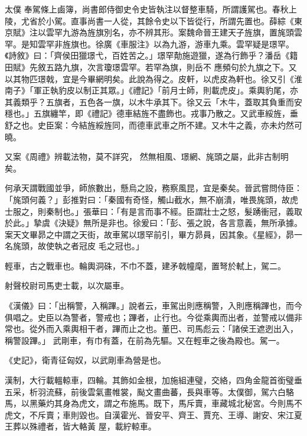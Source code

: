 \begin{pinyinscope}
 太僕
 奉駕條上鹵簿，尚書郎侍御史令史皆執注以督整車騎，所謂護駕也。春秋上陵，尤省於小駕。直事尚書一人從，其餘令史以下皆從行，所謂先置也。薛綜《東京賦》注以雲罕九游為旌旗別名，亦不辨其形。案魏命晉王建天子旌旗，置旄頭雲罕。是知雲罕非旌旗也。徐廣《車服注》以為九游，游車九乘。雲罕疑是璟罕。《詩敘》曰：「齊侯田獵璟弋，百姓苦之。」璟罕勣施遊獵，遂為行飾乎？潘岳《籍田賦》先敘五路九旗，次言瓊璟雲罕。若罕為旗，則岳不
 應頻句於九旗之下。又以其物匹璟戟，宜是今畢網明矣。此說為得之。皮軒，以虎皮為軒也。徐又引《淮南子》「軍正執豹皮以制正其眾。」《禮記》「前月士師，則載虎皮」。乘輿豹尾，亦其義類乎？五旗者，五色各一旗，以木牛承其下。徐又云「木牛，蓋取其負重而安穩也。」五旗纏竿，即《禮記》德車結旌不盡飾也。戎事乃散之。又武車綏旌，垂舒之也。史臣案：今結旌綏旌同，而德車武車之所不建。又木牛之義，亦未灼然可曉。



 又案《周禮》辨載法物，莫不詳究，
 然無相風、璟網、旄頭之屬，此非古制明矣。



 何承天謂戰國並爭，師旅數出，懸烏之設，務察風昆，宜是秦矣。晉武嘗問侍臣：「旄頭何義？」彭推對曰：「秦國有奇怪，觸山截水，無不崩潰，唯畏旄頭，故虎士服之，則秦制也。」張華曰：「有是言而事不經。臣謂壯士之怒，髮踴衝冠，義取於此。」摯虞《決疑》無所是非也。徐爰曰：「彭、張之說，各言意義，無所承據。案天文畢昴之中謂之天街，故車駕以璟罕前引，畢方昴員，因其象。《星經》，昴一名旄頭，故使執之者冠皮
 毛之冠也。」



 輕車，古之戰車也。輪輿洞硃，不巾不蓋，建矛戟幢麾，置弩於軾上，駕二。



 射聲校尉司馬吏士載，以次屬車。



 《漢儀》曰：「出稱警，入稱蹕。」說者云，車駕出則應稱警，入則應稱蹕也，而今俱唱之。史臣以為警者，警戒也；蹕者，止行也。今從乘輿而出者，並警戒以備非常也。從外而入乘輿相干者，蹕而止之也。董巴、司馬彪云：「諸侯王遮迾出入，稱警設蹕。」
 武剛車，有巾有蓋，在前為先驅。又在輕車之後為殿也。駕一。



 《史記》，衛青征匈奴，以武剛車為營是也。



 漢制，大行載轀輬車，四輪。其飾如金根，加施組連璧，交絡，四角金龍首銜璧垂五采，析羽流蘇，前後雲氣畫帷裳，颭文畫曲蕃，長與車等。太僕御，駕六白駱馬，以黑藥灼其身為虎文，謂之布施馬。既下，馬斥賣，車藏城北秘宮。今則馬不虎文，不斥賣；車則毀也。自漢霍光、晉安平、齊王、賈充、王導、謝安、宋江夏王葬以殊禮者，皆大輅黃
 屋，載紵輬車。




\end{pinyinscope}

